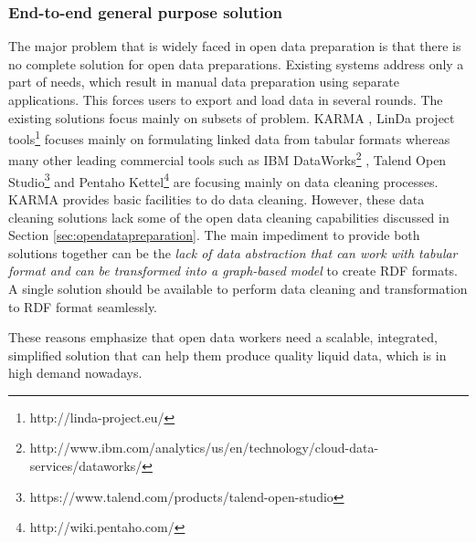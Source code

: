 \subsubsection{End-to-end general purpose solution}
\noindent The major problem that is widely faced in open data preparation is that there is no complete solution for open data preparations. Existing systems address only a part of needs, which result in manual data preparation using separate applications. This forces users to export and load data in several rounds. The existing solutions focus mainly on subsets of problem. KARMA \cite{karma}, LinDa project tools\footnote{http://linda-project.eu/} focuses mainly on formulating linked data from tabular formats whereas many other leading commercial tools such as IBM DataWorks\footnote{http://www.ibm.com/analytics/us/en/technology/cloud-data-services/dataworks/} , Talend Open Studio\footnote{https://www.talend.com/products/talend-open-studio} and Pentaho Kettel\footnote{http://wiki.pentaho.com/} are focusing mainly on data cleaning processes. KARMA provides basic facilities to do data cleaning. However, these data cleaning solutions lack some of the open data cleaning capabilities discussed in Section \ref{sec:opendatapreparation}. The main impediment to provide both solutions together can be the \textit{ lack of data abstraction that can work with tabular format and can be transformed into a graph-based model} to create RDF formats. A single solution should be available to perform data cleaning and transformation to RDF format seamlessly. 

These reasons emphasize that open data workers need a scalable, integrated, simplified solution that can help them produce quality liquid data, which is in high demand nowadays. 
